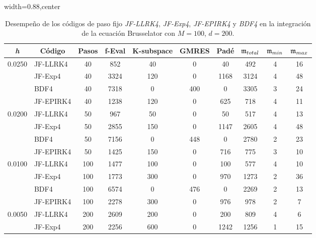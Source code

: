 \begin{table}[htb]
	\caption{Desempeño de los códigos de paso fijo \textit{JF-LLRK4}, \textit{JF-Exp4}, \textit{JF-EPIRK4} y \textit{BDF4} en la integración de la ecuación Brusselator con $M=100$, $d=200$.}
	\centering
	\begin{adjustbox}{width=0.88\columnwidth,center}
		\begin{tabular}{cccccccccc}
			\hline
			\textit{h} & Código & Pasos & f-Eval & K-subspace & GMRES & Padé & $\mathfrak{m}_{total}$ & $\mf%
			_{min}$ & $\mathfrak{m}_{max}$ \\ \hline
			\multicolumn{1}{l}{0.0250} & \multicolumn{1}{l}{JF-LLRK4} & 40 & 852 & 40 &
			0 & 40 & 492 & 4 & 16 \\
			\multicolumn{1}{l}{} & \multicolumn{1}{l}{JF-Exp4} & 40 & 3324 & 120 & 0 &
			1168 & 3124 & 4 & 48 \\
			\multicolumn{1}{l}{} & \multicolumn{1}{l}{BDF4} & 40 & 7318 & 0 & 400 & 0 &
			3305 & 3 & 24 \\
			\multicolumn{1}{l}{} & \multicolumn{1}{l}{JF-EPIRK4} & 40 & 1238 & 120 & 0 &
			625 & 718 & 4 & 11 \\
			\multicolumn{1}{l}{0.0200} & \multicolumn{1}{l}{JF-LLRK4} & 50 & 967 & 50 &
			0 & 50 & 517 & 4 & 13 \\
			\multicolumn{1}{l}{} & \multicolumn{1}{l}{JF-Exp4} & 50 & 2855 & 150 & 0 &
			1147 & 2605 & 4 & 48 \\
			\multicolumn{1}{l}{} & \multicolumn{1}{l}{BDF4} & 50 & 7156 & 0 & 448 & 0 &
			2780 & 2 & 23 \\
			\multicolumn{1}{l}{} & \multicolumn{1}{l}{JF-EPIRK4} & 50 & 1425 & 150 & 0 &
			716 & 775 & 3 & 10 \\
			\multicolumn{1}{l}{0.0100} & \multicolumn{1}{l}{JF-LLRK4} & 100 & 1477 & 100
			& 0 & 100 & 577 & 4 & 10 \\
			\multicolumn{1}{l}{} & \multicolumn{1}{l}{JF-Exp4} & 100 & 1773 & 300 & 0 &
			970 & 1273 & 2 & 36 \\
			\multicolumn{1}{l}{} & \multicolumn{1}{l}{BDF4} & 100 & 6574 & 0 & 476 & 0 &
			2269 & 2 & 13 \\
			\multicolumn{1}{l}{} & \multicolumn{1}{l}{JF-EPIRK4} & 100 & 2278 & 300 & 0 &
			976 & 978 & 2 & 7 \\
			\multicolumn{1}{l}{0.0050} & \multicolumn{1}{l}{JF-LLRK4} & 200 & 2609 & 200
			& 0 & 200 & 809 & 4 & 6 \\
			\multicolumn{1}{l}{} & \multicolumn{1}{l}{JF-Exp4} & 200 & 2256 & 600 & 0 &
			1242 & 1256 & 1 & 15 \\

\end{tabular}
\end{adjustbox}
\end{table}
